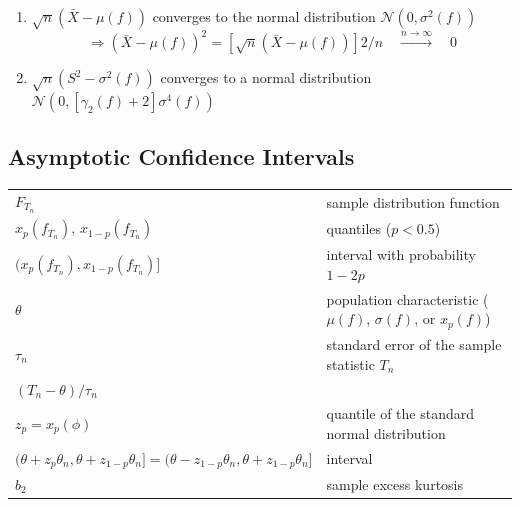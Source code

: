 \begin{enumerate}
\begin{enumerate}
        \item $\sqrt{n}(\bar{X} - \mu( f ))$ converges to the normal distribution $\mathcal{N}(0, \sigma^2( f ))$
        \[
            \Rightarrow
            (\bar{X} - \mu( f ))^2 
            = [\sqrt{n}(\bar{X} - \mu( f ))]2/n 
            \quad
            \overset{n\to \infty}{\longrightarrow}
            \quad
            0
        \]

        \item $\sqrt{n}(S^2 - \sigma^2( f ))$ converges to a normal distribution $\mathcal{N}(0,[\gamma_2( f ) + 2]\sigma^4( f ))$
    \end{enumerate}

    
\end{enumerate}

\subsection{Asymptotic Confidence Intervals \cite{ism-1}} \label{sample statistic: Asymptotic Confidence Intervals}

\begin{alternateColorTable}
\renewcommand{\arraystretch}{1.5}
\begin{longtable}[H]{l l}
    $F_{T_n}$ & sample distribution function \\

    $x_p( f_{T_n} )$, $x_{1-p}( f_{T_n} )$ & quantiles ($p < 0.5$)\\

    $(x_p( f_{T_n} ), x_{1-p}( f_{T_n} )]$ & interval with probability $1 - 2p$\\

    $\theta$ & population characteristic ($\mu( f )$, $\sigma ( f )$, or $x_p( f )$)\\

    $\tau_n$ & standard error of the sample statistic $T_n$ \\

    $(T_n - \theta )/\tau_n$ & \\

    $z_p = x_p (\phi)$ & quantile of the standard normal distribution\\

    $(\theta + z_p\theta_n, \theta + z_{1-p}\theta_n] = (\theta - z_{1-p}\theta_n, \theta + z_{1-p}\theta_n]$ & interval\\

    $b_2$ & sample excess kurtosis\\
\end{longtable}
\renewcommand{\arraystretch}{1}
\end{alternateColorTable}


